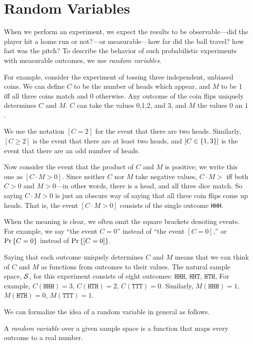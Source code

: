 \documentclass[11pt,twoside]{article}
\begin{document}

\section{Random Variables}
 
When we perform an experiment, we expect the results to be
observable---did the player hit a home run or not?---or measurable---how
far did the ball travel? how fast was the pitch?  To describe the behavior
of such probabilistic experiments with measurable outcomes, we use
\emph{random variables}.

For example, consider the experiment of tossing three independent,
unbiased coins.  We can define $C$ to be the number of heads which appear,
and $M$ to be 1 iff all three coins match and 0 otherwise.  Any outcome of
the coin flips uniquely determines $C$ and $M$.  $C$ can take the values
0,1,2, and 3, and $M$ the values $0$ an $1$.

We use the notation $[C = 2]$ for the event that there are two heads.
Similarly, $[C \geq 2]$ is the event that there are at least two heads,
and $[C \in \left\{1, 3\right\}]$ is the event that there are an odd number of
heads.

Now consider the event that the product of $C$ and $M$ is positive; we
write this one as $[C \cdot M >0]$.  Since neither $C$ nor $M$ take
negative values, $C\cdot M>$ iff both $C>0$ and $M>0$---in other words,
there is a head, and all three dice match.  So saying $C \cdot M >0$ is
just an obscure way of saying that all three coin flips come up heads.
That is, the event $[C \cdot M >0]$ consists of the single outcome
\texttt{HHH}.

When the meaning is clear, we often omit the square brackets denoting
events.  For example, we say ``the event $C=0$'' instead of ``the event
$[C=0]$,'' or $\mathop{\textup{Pr}}\nolimits\left\{C=0\right\}$ instead of $\mathop{\textup{Pr}}\nolimits\left\{[C=0]\right\}$.

Saying that each outcome uniquely determines $C$ and $M$ means that we can
think of $C$ and $M$ as functions from outcomes to their values.  The
natural sample space, $\mathcal{S}$, for this experiment consists of eight
outcomes: $\mathtt{HHH}$, $\mathtt{HHT}$, $\mathtt{HTH}$, \etc  For
example, $C(\mathtt{HHH}) = 3$, $C(\mathtt{HTH}) = 2$, $C(\mathtt{TTT}) =
0$.  Similarly, $M(\mathtt{HHH}) = 1$, $M(\mathtt{HTH}) = 0$,
$M(\mathtt{TTT}) = 1$.

We can formalize the idea of a random variable in general as follows.
\begin{definition}
A \emph{random variable} over a given sample space is a function that maps
every outcome to a real number.
\end{definition}
\end{document}
